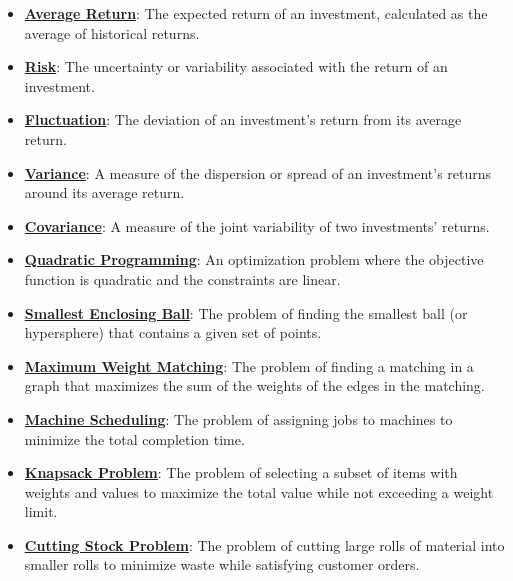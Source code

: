 \documentclass{article}%
\begin{document}
\begin{itemize}[leftmargin=*]
\item \href{https://www.math.purdue.edu/~yipn/421/2024-10-28-ApplsLinProg.pdf#page=9}{\textbf{Average Return}}: The expected return of an investment, calculated as the average of historical returns.%
\item \href{https://www.math.purdue.edu/~yipn/421/2024-10-28-ApplsLinProg.pdf#page=10}{\textbf{Risk}}: The uncertainty or variability associated with the return of an investment.%
\item \href{https://www.math.purdue.edu/~yipn/421/2024-10-28-ApplsLinProg.pdf#page=10}{\textbf{Fluctuation}}: The deviation of an investment's return from its average return.%
\item \href{https://www.math.purdue.edu/~yipn/421/2024-10-28-ApplsLinProg.pdf#page=13}{\textbf{Variance}}: A measure of the dispersion or spread of an investment's returns around its average return.%
\item \href{https://www.math.purdue.edu/~yipn/421/2024-10-28-ApplsLinProg.pdf#page=13}{\textbf{Covariance}}: A measure of the joint variability of two investments' returns.%
\item \href{https://www.math.purdue.edu/~yipn/421/2024-10-28-ApplsLinProg.pdf#page=16}{\textbf{Quadratic Programming}}: An optimization problem where the objective function is quadratic and the constraints are linear.%
\item \href{https://www.math.purdue.edu/~yipn/421/2024-10-28-ApplsLinProg.pdf#page=17}{\textbf{Smallest Enclosing Ball}}: The problem of finding the smallest ball (or hypersphere) that contains a given set of points.%
\item \href{https://www.math.purdue.edu/~yipn/421/2024-10-28-ApplsLinProg.pdf#page=19}{\textbf{Maximum Weight Matching}}: The problem of finding a matching in a graph that maximizes the sum of the weights of the edges in the matching.%
\item \href{https://www.math.purdue.edu/~yipn/421/2024-10-28-ApplsLinProg.pdf#page=22}{\textbf{Machine Scheduling}}: The problem of assigning jobs to machines to minimize the total completion time.%
\item \href{https://www.math.purdue.edu/~yipn/421/2024-10-28-ApplsLinProg.pdf#page=24}{\textbf{Knapsack Problem}}: The problem of selecting a subset of items with weights and values to maximize the total value while not exceeding a weight limit.%
\item \href{https://www.math.purdue.edu/~yipn/421/2024-10-28-ApplsLinProg.pdf#page=25}{\textbf{Cutting Stock Problem}}: The problem of cutting large rolls of material into smaller rolls to minimize waste while satisfying customer orders.%

\end{itemize}
\end{document}
